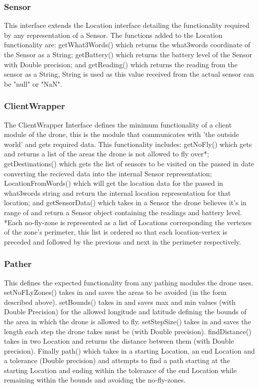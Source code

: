 \documentclass[12pt]{article}
\begin{document}
\subsubsection{Sensor}
This interface extends the Location interface detailing the functionality required by any representation of a Sensor. The functions added to the Location functionality are: getWhat3Words() which returns the what3words coordinate of the Sensor as a String; getBattery() which returns the battery level of the Sensor with Double precision; and getReading() which returns the reading from the sensor as a String, String is used as this value received from the actual sensor can be "null" or "NaN".
\subsubsection{ClientWrapper}
The ClientWrapper Interface defines the minimum functionality of a client module of the drone, this is the module that communicates with 'the outside world' and gets required data. This functionality includes: getNoFly() which gets and returns a list of the areas the drone is not allowed to fly over*; getDestinations() which gets the list of sensors to be visited on the passed in date converting the recieved data into the internal Sensor representation; LocationFromWords() which will get the location data for the passed in what3words string and return the internal location representation for that location; and getSensorData() which takes in a Sensor the drone believes it's in range of and return a Sensor object containing the readings and battery level. \newline
\newline
*Each no-fly-zone is represented as a list of Locations corresponding the vertexes of the zone's perimeter, this list is ordered so that each location-vertex is preceded and followed by the previous and next in the perimeter respectively.
\subsubsection{Pather}
This defines the expected functionality from any pathing modules the drone uses. setNoFLyZones() takes in and saves the areas to be avoided (in the form described above). setBounds() takes in and saves max and min values (with Double Precision) for the allowed longitude and latitude defining the bounds of the area in which the drone is allowed to fly. setStepSize() takes in and saves the length each step the drone takes must be (with Double precision). findDistance() takes in two Location and returns the distance between them (with Double precision). Finally path() which takes in a starting Location, an end Location and a tolerance (Double precision) and attempts to find a path starting at the starting Location and ending within the tolerance of the end Location while remaining within the bounds and avoiding the no-fly-zones.
\end{document}
